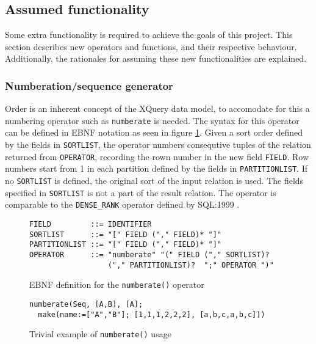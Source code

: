 \subsection{Assumed functionality}
\label{sect:method:marsAddedOperators}
Some extra functionality is required to achieve the goals of this project. This
section describes new operators and functions, and their respective behaviour.
Additionally, the rationales for assuming these new functionalities are
explained.

\subsubsection{Numberation/sequence generator}
Order is an inherent concept of the XQuery data model, to accomodate for this a numbering operator such as
\texttt{numberate} is needed. The syntax for this operator can be defined in EBNF notation as seen in figure
\ref{figure:mql:numberate_ebnf}. Given a sort order defined by the fields in \texttt{SORTLIST}, the operator
numbers consequtive tuples of the relation returned from \texttt{OPERATOR}, recording the rown number in the new
field \texttt{FIELD}. Row numbers start from 1 in each partition defined by the fields in \texttt{PARTITIONLIST}.
If no \texttt{SORTLIST} is defined, the original sort of the input relation is used. The fields specified in
\texttt{SORTLIST} is not a part of the result relation. The operator is comparable to the \texttt{DENSE\_RANK}
operator defined by SQL:1999 \cite{sqlbook}.

\begin{figure}[!h]
\begin{center}
\begin{Verbatim}
FIELD         ::= IDENTIFIER
SORTLIST      ::= "[" FIELD ("," FIELD)* "]"
PARTITIONLIST ::= "[" FIELD ("," FIELD)* "]"
OPERATOR      ::= "numberate" "(" FIELD ("," SORTLIST)? 
                  ("," PARTITIONLIST)?  ";" OPERATOR ")"
\end{Verbatim}
  \caption{EBNF definition for the \texttt{numberate()} operator}
  \label{figure:mql:numberate_ebnf}
\end{center}
\end{figure}

\begin{figure}[!h]
\begin{center}
\begin{Verbatim}
numberate(Seq, [A,B], [A];
  make(name:=["A","B"]; [1,1,1,2,2,2], [a,b,c,a,b,c]))
\end{Verbatim}
  \caption{Trivial example of \texttt{numberate()} usage}
  \label{figure:mql:numberate_example}
\end{center}
\end{figure}

